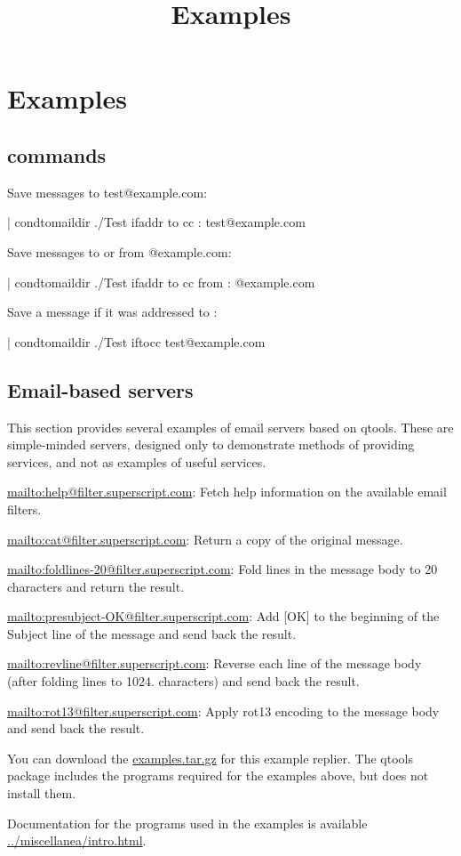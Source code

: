 \documentclass{book}
\title{Examples}
\begin{document}
\section{Examples}
\label{examples}


\subsection{ commands}
Save messages to test@example.com:
\begin{code}%
  | condtomaildir ./Test ifaddr to cc : test@example.com
\end{code}

Save messages to or from @example.com:
\begin{code}%
  | condtomaildir ./Test ifaddr to cc from : @example.com
\end{code}

Save a message if it was addressed to :
\begin{code}%
  | condtomaildir ./Test iftocc test@example.com
\end{code}

\subsection{Email-based servers}
This section provides several examples of email servers based on qtools.
These are simple-minded servers, designed only to demonstrate methods
of providing services, and not as examples of useful services.

\href{help}{mailto:help@filter.superscript.com}: Fetch help information on the available email filters.

\href{cat}{mailto:cat@filter.superscript.com}: Return a copy of the original message.

\href{foldlines-20}{mailto:foldlines-20@filter.superscript.com}:
    Fold lines in the message body to 20 characters and return the result.

\href{presubject-OK}{mailto:presubject-OK@filter.superscript.com}:
    Add [OK] to the beginning of the Subject line of the message
    and send back the result.

\href{revline}{mailto:revline@filter.superscript.com}: Reverse each line of the message body (after folding lines to 1024.
    characters) and send back the result.

\href{rot13}{mailto:rot13@filter.superscript.com}: Apply rot13 encoding to the message body and send back the result.

You can download the \href{scripts}{examples.tar.gz} for this example
replier.  The qtools package includes the programs required for the
examples above, but does not install them.

Documentation for the programs used in the examples is available
\href{here}{../miscellanea/intro.html}.
\end{document}
